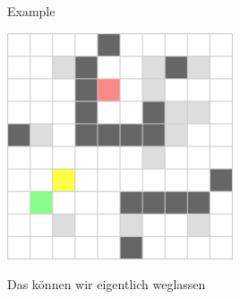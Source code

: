 \documentclass{presentation}
\begin{document}
\begin{frame}{Example}
    \begin{center}
        \includegraphics[width=0.5\textwidth]{figures/bounding_boxes2.png}
    \end{center}
\end{frame}



\begin{frame}

    Das können wir eigentlich weglassen
\end{frame}



\begin{frame}
\end{frame}
\end{document}
